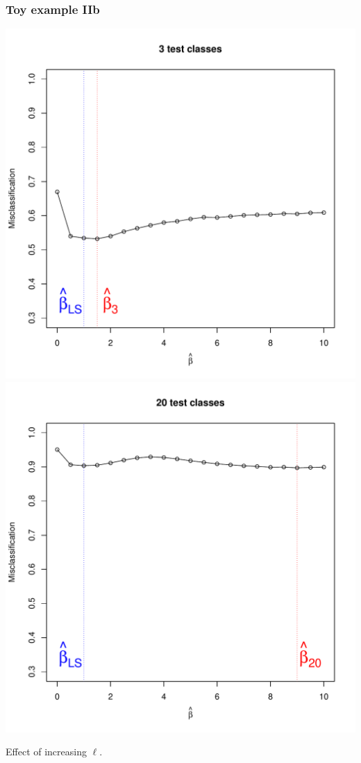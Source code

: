 \documentclass{beamer}
\begin{document}
\begin{frame}
\frametitle{Toy example IIb}
\begin{center}
\includegraphics[scale = 0.3]{toy2_l3.pdf}
\includegraphics[scale = 0.3]{toy2_l20.pdf}
\end{center}
Effect of increasing $\ell$.
\end{frame}
\end{document}
